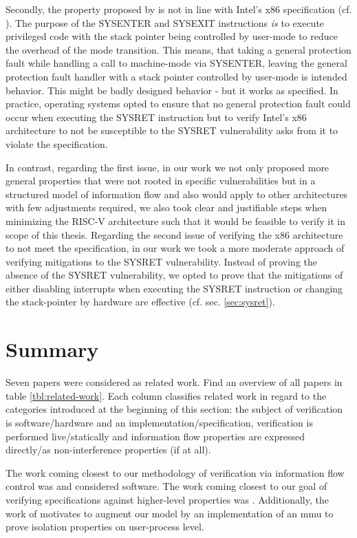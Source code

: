 Secondly, the property proposed by \citeauthor{BradfieldS16} is not in line with Intel's x86 specification (cf. \cite{Dunlap19}).
The purpose of the SYSENTER and SYSEXIT instructions \textit{is} to execute privileged code with the stack pointer being controlled by user-mode to reduce the overhead of the mode transition.
This means, that taking a general protection fault while handling a call to machine-mode via SYSENTER, leaving the general protection fault handler with a stack pointer controlled by user-mode is intended behavior.
This might be badly designed behavior - but it works as specified.
In practice, operating systems opted to ensure that no general protection fault could occur when executing the SYSRET instruction but to verify Intel's x86 architecture to not be susceptible to the SYSRET vulnerability asks from it to violate the specification.

In contrast, regarding the first issue, in our work we not only proposed more general properties that were not rooted in specific vulnerabilities but in a structured model of information flow and also would apply to other architectures with few adjustments required, we also took clear and justifiable steps when minimizing the RISC-V architecture such that it would be feasible to verify it in scope of this thesis.
Regarding the second issue of verifying the x86 architecture to not meet the specification, in our work we took a more moderate approach of verifying mitigations to the SYSRET vulnerability.
Instead of proving the absence of the SYSRET vulnerability, we opted to prove that the mitigations of either disabling interrupts when executing the SYSRET instruction or changing the stack-pointer by hardware are effective (cf. sec. \ref{sec:sysret}).

\section{Summary}

Seven papers were considered as related work.
Find an overview of all papers in table \ref{tbl:related-work}.
Each column classifies related work in regard to the categories introduced at the beginning of this section: the subject of verification is software/hardware and an implementation/specification, verification is performed live/statically and information flow properties are expressed directly/as non-interference properties (if at all).

The work coming closest to our methodology of verification via information flow control was \cite{GordonKPGNR15,SuhLZD04} and considered software.
The work coming closest to our goal of verifying specifications against higher-level properties was \cite{Fox02,KhakpourSD13,BradfieldS16}.
Additionally, the work of \cite{SuhLZD04,KhakpourSD13} motivates to augment our model by an implementation of an \gls{mmu} to prove isolation properties on user-process level.

